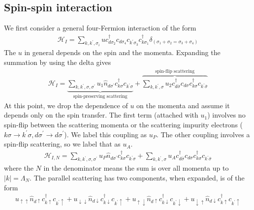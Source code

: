 \documentclass[twoside]{report}
\numberwithin{equation}{section}
\begin{document}
\subsection{Spin-spin interaction}
We first consider a general four-Fermion interaction of the form
\begin{equation}\begin{aligned}
	\mathcal{H}_I = \sum_{k,k^\prime ,\sigma_i}u c^\dagger_{d\sigma_2}c_{d\sigma_4}c_{k^\prime \sigma_3}c^\dagger_{k\sigma_1}\delta_{\left(\sigma_1 + \sigma_2 = \sigma_3 + \sigma_4\right)}
\end{aligned}\end{equation}
The \(u\) in general depends on the spin and the momenta. Expanding the summation by using the delta gives
\begin{equation}\begin{aligned}
\mathcal{H}_I = \underbrace{\sum_{k,k^\prime ,\sigma,\sigma^\prime}u_1 \hat n_{d\sigma^\prime}c^\dagger_{k\sigma}c_{k^\prime \sigma}}_\text{spin-preserving scattering} + \overbrace{\sum_{k,k^\prime ,\sigma}u_2 c^\dagger_{d\overline\sigma}c_{d\sigma}c^\dagger_{k\sigma}c_{k^\prime \overline\sigma}}^\text{spin-flip scattering}
\end{aligned}\end{equation}
At this point, we drop the dependence of \(u\) on the momenta and assume it depends only on the spin transfer. The first term (attached with \(u_1\)) involves no spin-flip between the scattering momenta or the scattering impurity electrons (\(k\sigma \to k^\prime \sigma, d\sigma^\prime \to d\sigma^\prime\)). We label this coupling as \(u_P\). The other coupling involves a spin-flip scattering, so we label that as \(u_A\).
\begin{equation}\begin{aligned}
\mathcal{H}_{I,N} = \sum_{k,k^\prime ,\sigma,\sigma^\prime}u_P \hat n_{d\sigma^\prime}c^\dagger_{k\sigma}c_{k^\prime\sigma}+ \sum_{k,k^\prime ,\sigma}u_A c^\dagger_{d\overline\sigma}c_{d\sigma}c^\dagger_{k\sigma}c_{k^\prime \overline\sigma}
\end{aligned}\end{equation}
where the \(N\) in the denominator means the sum is over all momenta up to \(|k| = \Lambda_N\). The parallel scattering has two components, when expanded, is of the form
\begin{equation}\begin{aligned}
u_{\uparrow\uparrow}\hat n_{d\uparrow}c^\dagger_{k\uparrow}c_{k^\prime\uparrow} + u_{\downarrow\downarrow}\hat n_{d\downarrow}c^\dagger_{k\downarrow}c_{k^\prime\uparrow} + u_{\uparrow\downarrow}\hat n_{d\uparrow}c^\dagger_{k\downarrow}c_{k^\prime\downarrow} + u_{\downarrow\uparrow}\hat n_{d\downarrow}c^\dagger_{k\uparrow}c_{k^\prime\uparrow}
\end{aligned}\end{equation}
\end{document}
